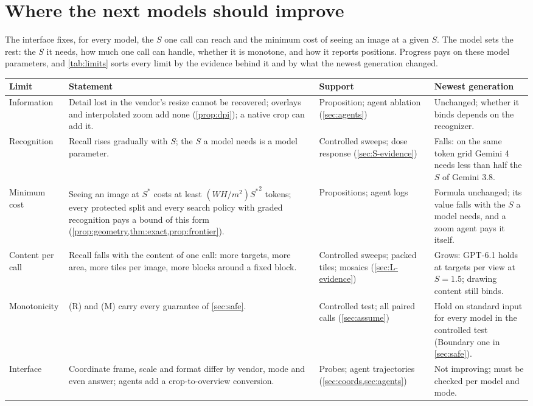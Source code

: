 \section{Where the next models should improve}
\label{sec:future}

The interface fixes, for every model, the $S$ one call can reach and the minimum cost of seeing an image at a given $S$. The model sets the rest: the $S$ it needs, how much one call can handle, whether it is monotone, and how it reports positions. Progress pays on these model parameters, and \cref{tab:limits} sorts every limit by the evidence behind it and by what the newest generation changed.

\begin{table}[t]
\centering
\small
\begin{tabular}{p{2.1cm}p{5.8cm}p{2.6cm}p{3.8cm}}
\toprule
Limit & Statement & Support & Newest generation \\
\midrule
Information & Detail lost in the vendor's resize cannot be recovered; overlays and interpolated zoom add none (\cref{prop:dpi}); a native crop can add it. & Proposition; agent ablation (\cref{sec:agents}) & Unchanged; whether it binds depends on the recognizer. \\
Recognition & Recall rises gradually with $S$; the $S$ a model needs is a model parameter. & Controlled sweeps; dose response (\cref{sec:S-evidence}) & Falls: on the same token grid Gemini 4 needs less than half the $S$ of Gemini 3.8. \\
Minimum cost & Seeing an image at $S^\ast$ costs at least $(WH/m^2){S^\ast}^2$ tokens; every protected split and every search policy with graded recognition pays a bound of this form (\cref{prop:geometry,thm:exact,prop:frontier}). & Propositions; agent logs & Formula unchanged; its value falls with the $S$ a model needs, and a zoom agent pays it itself. \\
Content per call & Recall falls with the content of one call: more targets, more area, more tiles per image, more blocks around a fixed block. & Controlled sweeps; packed tiles; mosaics (\cref{sec:L-evidence}) & Grows: GPT-6.1 holds at \CgenGptSixOneMax{} targets per view at $S = 1.5$; drawing content still binds. \\
Monotonicity & (R) and (M) carry every guarantee of \cref{sec:safe}. & Controlled test; all paired calls (\cref{sec:assume}) & Hold on standard input for every model in the controlled test (Boundary one in \cref{sec:safe}). \\
Interface & Coordinate frame, scale and format differ by vendor, mode and even answer; agents add a crop-to-overview conversion. & Probes; agent trajectories (\cref{sec:coords,sec:agents}) & Not improving; must be checked per model and mode. \\

\end{tabular}
\end{table}
